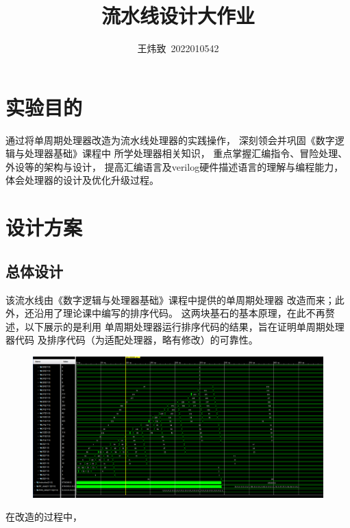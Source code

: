 \documentclass[10pt]{article}
\title{流水线设计大作业}
\author{王炜致\ 2022010542}
\date{}
\begin{document}
\maketitle
\section{实验目的}
通过将单周期处理器改造为流水线处理器的实践操作，
深刻领会并巩固《数字逻辑与处理器基础》课程中
所学处理器相关知识，
重点掌握汇编指令、冒险处理、外设等的架构与设计，
提高汇编语言及verilog硬件描述语言的理解与编程能力，
体会处理器的设计及优化升级过程。
\section{设计方案}
\subsection{总体设计}
该流水线由《数字逻辑与处理器基础》课程中提供的单周期处理器
改造而来；此外，还沿用了理论课中编写的排序代码。
这两块基石的基本原理，在此不再赘述，以下展示的是利用
单周期处理器运行排序代码的结果，旨在证明单周期处理器代码
及排序代码（为适配处理器，略有修改）的可靠性。
\begin{figure}[H]
    \centering
    \includegraphics[scale=0.38]{MUCHOGUSTO.png}
    \end{figure}
    
在改造的过程中，
\end{document}
